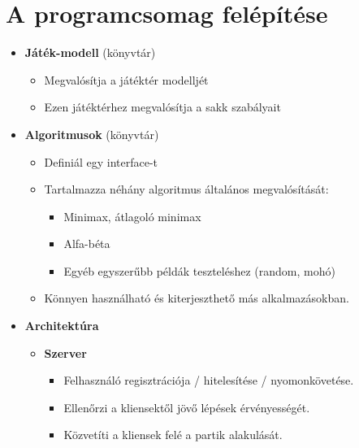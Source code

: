 \documentclass[twoside, a4paper, 12pt]{book}
\begin{document}
\section{A programcsomag felépítése}
\begin{itemize}
	\item \textbf{Játék-modell} (könyvtár)
	\begin{itemize}
		\item Megvalósítja a játéktér modelljét
		\item Ezen játéktérhez megvalósítja a sakk szabályait
	\end{itemize}
	
	\item \textbf{Algoritmusok} (könyvtár)
	\begin{itemize}
		\item Definiál egy interface-t
		\item Tartalmazza néhány algoritmus általános megvalósítását:
		\begin{itemize}
			\item Minimax, átlagoló minimax
			\item Alfa-béta
			\item Egyéb egyszerűbb példák teszteléshez (random, mohó)
		\end{itemize}
		\item Könnyen használható és kiterjeszthető más alkalmazásokban.
	\end{itemize}
	
	\item \textbf{Architektúra}
	\begin{itemize}
		\item \textbf{Szerver}
		\begin{itemize}
			\item Felhasználó regisztrációja / hitelesítése / nyomonkövetése.
			\item Ellenőrzi a kliensektől jövő lépések érvényességét.
			\item Közvetíti a kliensek felé a partik alakulását.
		\end{itemize}
		

\end{itemize}
\end{itemize}
\end{document}

